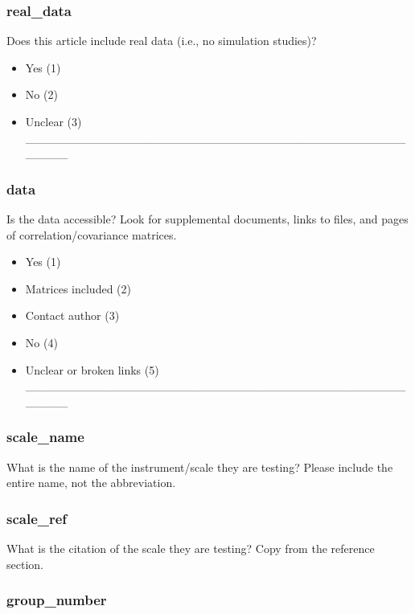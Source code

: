 \documentclass[
  man]{apa7}
\providecommand{\tightlist}{%
  \setlength{\itemsep}{0pt}\setlength{\parskip}{0pt}}
\begin{document}
\subsubsection{real\_data}\label{real_data}

Does this article include real data (i.e., no simulation studies)?

\begin{itemize}
\tightlist
\item
  Yes (1)
\item
  No (2)
\item
  Unclear (3) \_\_\_\_\_\_\_\_\_\_\_\_\_\_\_\_\_\_\_\_\_\_\_\_\_\_\_\_\_\_\_\_\_\_\_\_\_\_\_\_\_\_\_\_\_\_\_\_\_\_
\end{itemize}

\subsubsection{data}\label{data}

Is the data accessible? Look for supplemental documents, links to files, and pages of correlation/covariance matrices.

\begin{itemize}
\tightlist
\item
  Yes (1)
\item
  Matrices included (2)
\item
  Contact author (3)
\item
  No (4)
\item
  Unclear or broken links (5) \_\_\_\_\_\_\_\_\_\_\_\_\_\_\_\_\_\_\_\_\_\_\_\_\_\_\_\_\_\_\_\_\_\_\_\_\_\_\_\_\_\_\_\_\_\_\_\_\_\_
\end{itemize}

\subsubsection{scale\_name}\label{scale_name}

What is the name of the instrument/scale they are testing? Please include the entire name, not the abbreviation.

\subsubsection{scale\_ref}\label{scale_ref}

What is the citation of the scale they are testing? Copy from the reference section.

\subsubsection{group\_number}\label{group_number}
\end{document}
